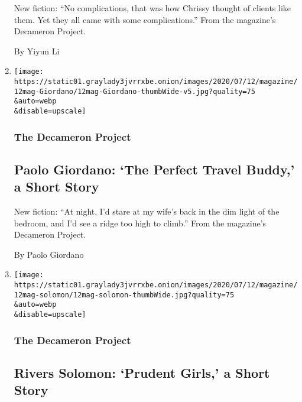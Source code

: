 \begin{enumerate}
  New fiction: ``No complications, that was how Chrissy thought of
  clients like them. Yet they all came with some complications.'' From
  the magazine's Decameron Project.

  By Yiyun Li
\item
  \href{/interactive/2020/07/07/magazine/Paolo-Giordano-short-story.html}{}

  \texttt{[image: https://static01.graylady3jvrrxbe.onion/images/2020/07/12/magazine/12mag-Giordano/12mag-Giordano-thumbWide-v5.jpg?quality=75\\\&auto=webp\\\&disable=upscale]}

  \hypertarget{the-decameron-project-11}{%
  \subsubsection{The Decameron Project}\label{the-decameron-project-11}}

  \hypertarget{paolo-giordano-the-perfect-travel-buddy-a-short-story}{%
  \subsection{Paolo Giordano: `The Perfect Travel Buddy,' a Short
  Story}\label{paolo-giordano-the-perfect-travel-buddy-a-short-story}}

  New fiction: ``At night, I'd stare at my wife's back in the dim light
  of the bedroom, and I'd see a ridge too high to climb.'' From the
  magazine's Decameron Project.

  By Paolo Giordano
\item
  \href{/interactive/2020/07/07/magazine/rivers-solomon-short-story.html}{}

  \texttt{[image: https://static01.graylady3jvrrxbe.onion/images/2020/07/12/magazine/12mag-solomon/12mag-solomon-thumbWide.jpg?quality=75\\\&auto=webp\\\&disable=upscale]}

  \hypertarget{the-decameron-project-12}{%
  \subsubsection{The Decameron Project}\label{the-decameron-project-12}}

  \hypertarget{rivers-solomon-prudent-girls-a-short-story}{%
  \subsection{Rivers Solomon: `Prudent Girls,' a Short
  Story}\label{rivers-solomon-prudent-girls-a-short-story}}


\end{enumerate}
